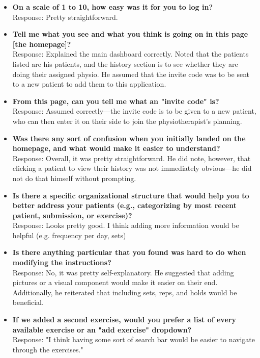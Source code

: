 \documentclass[12pt, titlepage]{article}
\begin{document}
\begin{itemize}
    \item \textbf{On a scale of 1 to 10, how easy was it for you to log in?} \\
    Response: Pretty straightforward. 

    \item \textbf{Tell me what you see and what you think is going on in this page [the homepage]?} \\
    Response: Explained the main dashboard correctly. Noted that the patients listed are his patients, and the history section is to see whether they are doing their assigned physio. He assumed that the invite code was to be sent to a new patient to add them to this application.

    \item \textbf{From this page, can you tell me what an "invite code" is?} \\
    Response: Assumed correctly—the invite code is to be given to a new patient, who can then enter it on their side to join the physiotherapist's planning.

    \item \textbf{Was there any sort of confusion when you initially landed on the homepage, and what would make it easier to understand?} \\
    Response: Overall, it was pretty straightforward. He did note, however, that clicking a patient to view their history was not immediately obvious—he did not do that himself without prompting.

    \item \textbf{Is there a specific organizational structure that would help you to better address your patients (e.g., categorizing by most recent patient, submission, or exercise)?} \\
    Response: Looks pretty good. I think adding more information would be helpful (e.g. frequency per day, sets)

    \item \textbf{Is there anything particular that you found was hard to do when modifying the instructions?} \\
    Response: No, it was pretty self-explanatory. He suggested that adding pictures or a visual component would make it easier on their end. Additionally, he reiterated that including sets, reps, and holds would be beneficial.

    \item \textbf{If we added a second exercise, would you prefer a list of every available exercise or an "add exercise" dropdown?} \\
    Response: "I think having some sort of search bar would be easier to navigate through the exercises."


\end{itemize}
\end{document}
